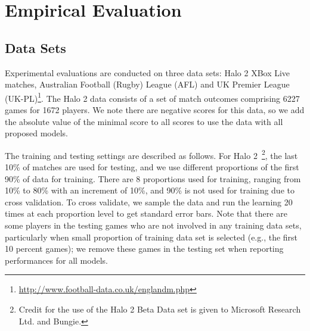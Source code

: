\documentclass[runningheads,a4paper]{llncs}
\begin{document}

\section{Empirical Evaluation}

\subsection{Data Sets}

\label{sec:data_sets}

Experimental evaluations are conducted on three data sets: Halo 2 XBox Live
matches, Australian Football
(Rugby) League (AFL)%
and UK
Premier League (UK-PL)\footnote{\noindent \url{http://www.football-data.co.uk/englandm.php}}.  The Halo 2 data consists of a
set of match outcomes comprising 6227 games for 1672 players. We note there are negative scores for this data, so we add the absolute value of the minimal score to all scores to use the data with all proposed models.

The training and testing settings are described as follows.  For Halo
2~\footnote{\noindent Credit for the use of the Halo 2 Beta Data set
is given to Microsoft Research Ltd. and Bungie.}, the last 10\%
of matches are used for testing, and we use different proportions of
the first 90\% of data for training. There are 8 proportions used
for training, ranging from 10\% to 80\% with an increment of
10\%, and 90\% is not used for training due to cross validation. To cross validate, we sample the data and run the learning 20 times at each proportion level
to get standard error bars. Note that there are some players in the
testing games who are not involved in any training data sets,
particularly when small proportion of training data set is selected
(e.g., the first 10 percent games); we remove these games in the
testing set when reporting performances for all models.
\end{document}
